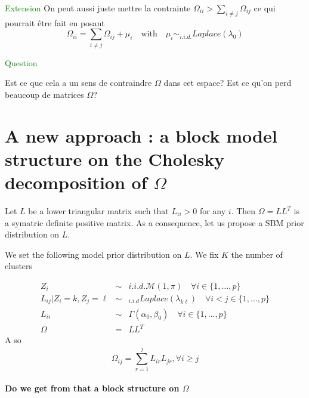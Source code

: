 \documentclass[10pt]{article}
\begin{document}
\textcolor{green}{Extension}
On peut aussi juste mettre la contrainte  $\Omega_{ii} > \sum_{i\neq j } \Omega_{ij} $ ce qui pourrait être fait en posant 
$$\Omega_{ii}  = \sum_{i\neq j } \Omega_{ij}  + \mu_i  \quad \mbox{with} \quad \mu_i \sim_{i.i.d.}  Laplace(\lambda_0)$$ 


\textcolor{green}{Question}

Est ce que cela a  un sens de contraindre $\Omega$ dans cet espace?  Est ce qu'on perd beaucoup de matrices $\Omega$?  

\section{A new approach : a block model structure on the Cholesky decomposition of $\Omega$}

Let $L$ be a lower triangular matrix such that $L_{ii}>0$ for any $i$. 
Then $\Omega  = L L^T$ is a symatric definite positive matrix. 
As a consequence, let us propose a SBM prior distribution on $L$. 


We set the following model prior distribution on  $L$. We fix $K$ the number of clusters

\begin{eqnarray*}
 Z_i &\sim& {i.i.d.} \mathcal{M}(1,\pi)  \quad  \forall i \in \{1, \dots, p\} \\
 L_{ij} | Z_i=k,Z_j=\ell &\sim&_{i.i.d} Laplace(\lambda_{k\ell})  \quad  \forall i<j \in \{1, \dots, p\}\\
 L_{ii} &\sim& \Gamma(\alpha_0, \beta_0)  \quad  \forall i  \in \{1, \dots, p\}\\
\Omega &=& L L^T
\end{eqnarray*}
A so
$$\Omega_{ij} = \sum_{r=1}^j L_{ir} L_{jr}, \forall i \geq j$$

\paragraph{Do we get from that a block structure on $\Omega$}
\end{document}
